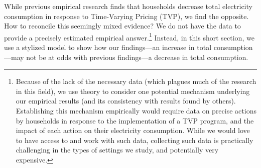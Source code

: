 \documentclass[12pt]{article}
\begin{document}
While previous empirical research finds that households decrease total electricity consumption in response to Time-Varying Pricing (TVP), we find the opposite. How to reconcile this seemingly mixed evidence? We do not have the data to provide a precisely estimated empirical answer.\footnote{Because of the lack of the necessary data (which plagues much of the research in this field), we use theory to consider one potential mechanism underlying our empirical results (and its consistency with results found by others). Establishing this mechanism empirically would require data on precise actions by households in response to the implementation of a TVP program, and the impact of each action on their electricity consumption. While we would love to have access to and work with such data, collecting such data is practically challenging in the types of settings we study, and potentially very expensive.} Instead, in this short section, we use a stylized model to show how our findings---an increase in total consumption---may not be at odds with previous findings---a decrease in total consumption.
\end{document}
